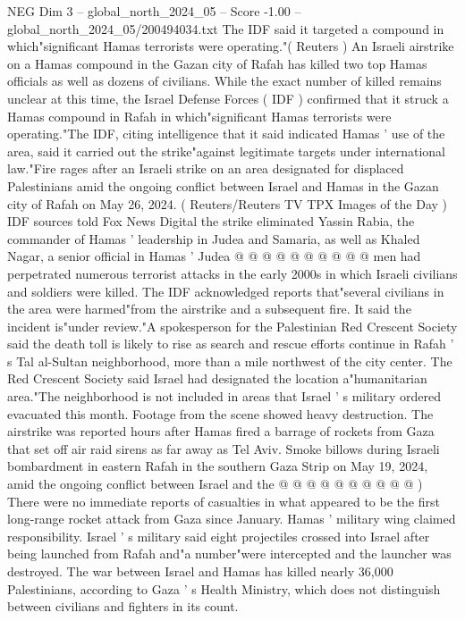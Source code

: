 \begin{textsample}{NEG Dim 3 – global\_north\_2024\_05 – Score -1.00 – global\_north\_2024\_05/200494034.txt}  \label{ex:f3_neg_441}
The IDF said it targeted a compound in which"significant Hamas terrorists were operating."( Reuters ) An Israeli airstrike on a Hamas compound in the Gazan city of Rafah has killed two top Hamas officials as well as dozens of civilians.
While the exact number of killed remains unclear at this time, the Israel Defense Forces ( IDF ) confirmed that it struck a Hamas compound in Rafah in which"significant Hamas terrorists were operating."The IDF, citing intelligence that it said indicated Hamas ' use of the area, said it carried out the strike"against legitimate targets under international law."Fire rages after an Israeli strike on an area designated for displaced Palestinians amid the ongoing conflict between Israel and Hamas in the Gazan city of Rafah on May 26, 2024. ( Reuters/Reuters TV TPX Images of the Day ) IDF sources told Fox News Digital the strike eliminated Yassin Rabia, the commander of Hamas ' leadership in Judea and Samaria, as well as Khaled Nagar, a senior official in Hamas ' Judea @ @ @ @ @ @ @ @ @ @ men had perpetrated numerous terrorist attacks in the early 2000s in which Israeli civilians and soldiers were killed.
The IDF acknowledged reports that"several civilians in the area were harmed"from the airstrike and a subsequent fire.
It said the incident is"under review."A spokesperson for the Palestinian Red Crescent Society said the death toll is likely to rise as search and rescue efforts continue in Rafah ' s Tal al-Sultan neighborhood, more than a mile northwest of the city center.
The Red Crescent Society said Israel had designated the location a"humanitarian area."The neighborhood is not included in areas that Israel ' s military ordered evacuated this month.
Footage from the scene showed heavy destruction.
The airstrike was reported hours after Hamas fired a barrage of rockets from Gaza that set off air raid sirens as far away as Tel Aviv.
Smoke billows during Israeli bombardment in eastern Rafah in the southern Gaza Strip on May 19, 2024, amid the ongoing conflict between Israel and the @ @ @ @ @ @ @ @ @ @ ) There were no immediate reports of casualties in what appeared to be the first long-range rocket attack from Gaza since January.
Hamas ' military wing claimed responsibility.
Israel ' s military said eight projectiles crossed into Israel after being launched from Rafah and"a number"were intercepted and the launcher was destroyed.
The war between Israel and Hamas has killed nearly 36,000 Palestinians, according to Gaza ' s Health Ministry, which does not distinguish between civilians and fighters in its count.

\end{textsample}

